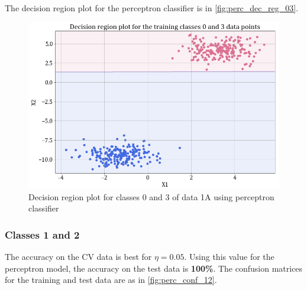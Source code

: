 \documentclass[11pt,a4paper]{article}
\begin{document}
The decision region plot for the perceptron classifier is in \autoref{fig:perc_dec_reg_03}.
\begin{figure}[H]
    \centering
    \includegraphics[scale=0.45]{images/1A_perceptron_training_classes_0_and_3_dec_reg.png}
    \caption{Decision region plot for classes 0 and 3 of data 1A using perceptron classifier}
    \label{fig:perc_dec_reg_03}
\end{figure}
\subsubsection{Classes 1 and 2}


The accuracy on the CV data is best for $\eta = 0.05$. Using this value for the perceptron model, the accuracy on the test data is \textbf{100\%}. The confusion matrices for the training and test data are as in \autoref{fig:perc_conf_12}.
\end{document}
